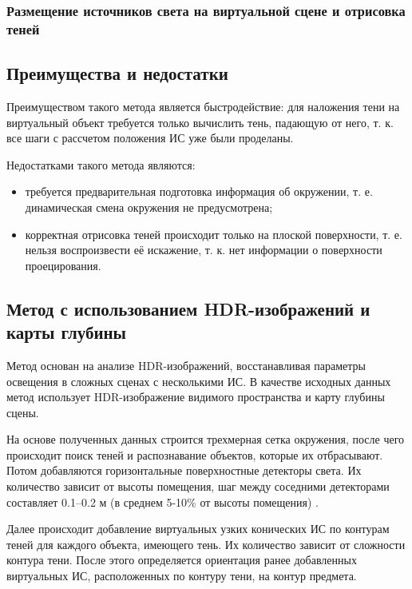 \subsubsection*{Размещение источников света на виртуальной сцене и отрисовка теней}



\subsection*{Преимущества и недостатки}

Преимуществом такого метода является быстродействие: для наложения тени на виртуальный объект требуется только вычислить тень, падающую от него, т. к. все шаги с рассчетом положения ИС уже были проделаны.

Недостатками такого метода являются:
\begin{itemize}
	\item требуется предварительная подготовка информация об окружении, т. е. динамическая смена окружения не предусмотрена;
	\item корректная отрисовка теней происходит только на плоской поверхности, т. е. нельзя воспроизвести её искажение, т. к. нет информации о поверхности проецирования.
\end{itemize}

\subsection{Метод с использованием HDR-изображений и карты глубины}

Метод основан на анализе HDR-изображений, восстанавливая параметры освещения в сложных сценах с несколькими ИС. В качестве исходных данных метод использует HDR-изображение видимого пространства и карту глубины сцены.

На основе полученных данных строится трехмерная сетка окружения, после чего происходит поиск теней и распознавание объектов, которые их отбрасывают. Потом добавляются горизонтальные поверхностные детекторы света. Их количество зависит от высоты помещения, шаг между соседними детекторами составляет 0.1–0.2 м (в среднем 5-10\% от высоты помещения) \cite{hdr_method}.

Далее происходит добавление виртуальных узких конических ИС по контурам теней для каждого объекта, имеющего тень. Их количество зависит от сложности контура тени. После этого определяется ориентация ранее добавленных виртуальных ИС,  расположенных по контуру тени, на контур предмета.

